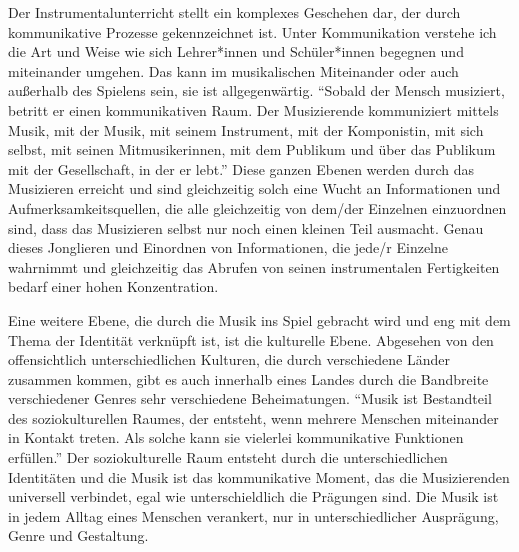 Der Instrumentalunterricht stellt ein komplexes Geschehen dar, der durch
kommunikative Prozesse gekennzeichnet ist. Unter Kommunikation verstehe ich die
Art und Weise wie sich Lehrer*innen und Schüler*innen begegnen und miteinander
umgehen. Das kann im musikalischen Miteinander oder auch außerhalb des Spielens
sein, sie ist allgegenwärtig. \enquote{Sobald der Mensch musiziert, betritt er
einen kommunikativen Raum. Der Musizierende kommuniziert mittels Musik, mit der
Musik, mit seinem Instrument, mit der Komponistin, mit sich selbst, mit seinen
Mitmusikerinnen, mit dem Publikum und über das Publikum mit der Gesellschaft, in
der er lebt.} \autocite[56]{doerne:umfassend_musizieren} Diese ganzen Ebenen
werden durch das Musizieren erreicht und sind gleichzeitig solch eine Wucht an
Informationen und Aufmerksamkeitsquellen, die alle gleichzeitig von dem/der
Einzelnen einzuordnen sind, dass das Musizieren selbst nur noch einen kleinen
Teil ausmacht. Genau dieses Jonglieren und Einordnen von Informationen, die
jede/r Einzelne wahrnimmt und gleichzeitig das Abrufen von seinen instrumentalen
Fertigkeiten bedarf einer hohen Konzentration.

Eine weitere Ebene, die durch die Musik ins Spiel gebracht wird und eng mit dem
Thema der Identität verknüpft ist, ist die kulturelle Ebene. Abgesehen von den
offensichtlich unterschiedlichen Kulturen, die durch verschiedene Länder
zusammen kommen, gibt es auch innerhalb eines Landes durch die Bandbreite
verschiedener Genres sehr verschiedene Beheimatungen. \enquote{Musik ist
Bestandteil des soziokulturellen Raumes, der entsteht, wenn mehrere Menschen
miteinander in Kontakt treten. Als solche kann sie vielerlei kommunikative
Funktionen erfüllen.} \autocite[56]{doerne:umfassend_musizieren} Der
soziokulturelle Raum entsteht durch die unterschiedlichen Identitäten und die
Musik ist das kommunikative Moment, das die Musizierenden universell verbindet,
egal wie unterschieldlich die Prägungen sind. Die Musik ist in jedem Alltag
eines Menschen verankert, nur in unterschiedlicher Ausprägung, Genre und
Gestaltung.



